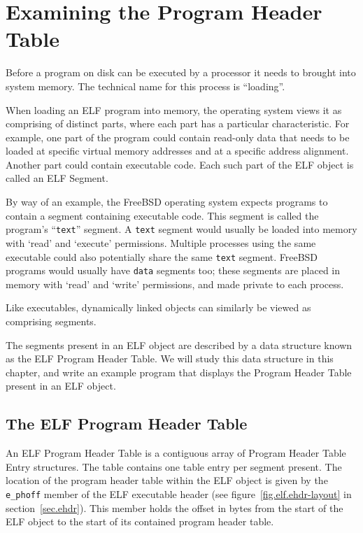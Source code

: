\documentclass[a4paper,pdftex]{book}
\newcommand{\filename}[1]{\texttt{#1}}
\newcommand{\parameter}[1]{\texttt{#1}}
\newcommand{\trade}{\texttrademark\xspace}
\newcommand{\elfdatastructure}[1]{\textsf{#1}}
\begin{document}
\chapter{Examining the Program Header Table}\label{chap.elf-phdr}

Before a program on disk can be executed by a processor it needs to
brought into system memory. The technical name for this process is
``loading''.

When loading an ELF program into memory, the operating system views it
as comprising of distinct parts, where each part has a particular
characteristic. For example, one part of the program could contain
read-only data that needs to be loaded at specific virtual memory
addresses and at a specific address alignment. Another part could
contain executable code. Each such part of the ELF
object is called an ELF
\elfdatastructure{Segment}.

By way of an example, the FreeBSD\trade operating system expects
programs to contain a segment containing executable
code. This segment is called the
program's ``\filename{text}'' segment. A \filename{text} segment would
usually be loaded into memory with `read' and `execute' permissions.
Multiple processes using the same executable could also potentially
share the same \filename{text} segment.  FreeBSD programs would
usually have \filename{data} segments too; these segments are placed
in memory with `read' and `write' permissions, and made private to
each process.

Like executables, dynamically linked objects can similarly be viewed
as comprising segments.

The segments present in an ELF object are described by a data
structure known as the ELF \elfdatastructure{Program Header
  Table}. We will study this data
structure in this chapter, and write an example program that displays
the \elfdatastructure{Program Header Table} present in an ELF object.

\section{The ELF Program Header Table}

An ELF \elfdatastructure{Program Header Table} is a contiguous array
of \elfdatastructure{Program Header Table Entry} structures. The table
contains one table entry per segment present. The location of the
program header table within the ELF object is given by the
\parameter{e\_phoff} member of the ELF executable header (see
figure~\ref{fig.elf.ehdr-layout} in section~\ref{sec.ehdr}). This member
holds the offset in bytes from the start of the ELF object to the
start of its contained program header table.
\end{document}
